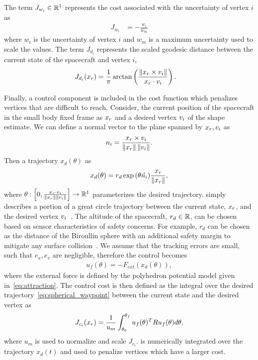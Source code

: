 \documentclass[journal]{new-aiaa}
\begin{document}
The term \( J_{w_i} \in \mathbb{R}^1 \) represents the cost associated with the uncertainty of vertex \( i \) as
\begin{align}\label{eq:weight_cost}
    J_{w_i} &= - \frac{w_i}{w_m}
\end{align}
where \( w_i \) is the uncertainty of vertex \( i \) and \( w_m \) is a maximum uncertainty used to scale the values.
The term \( J_{d_i} \) represents the scaled geodesic distance between the current state of the spacecraft and vertex \( i \),
\begin{align}\label{eq:distance_cost}
    J_{d_i}(x_r) &= \frac{1}{\pi} \arctan \left(  \frac{\left\| x_r \times v_i \right\|}{x_r \cdot v_i} \right).
\end{align}

Finally, a control component is included in the cost function which penalizes vertices that are difficult to reach.
Consider, the current position of the spacecraft in the small body fixed frame as \( x_r\) and a desired vertex \( v_i \) of the shape estimate.
We can define a normal vector to the plane spanned by \( x_r, v_i \) as
\begin{align}\label{eq:normal_to_plane}
    n_i = \frac{x_r \times v_i}{\left\| x_r \right\| \left\| v_i \right\|}.
\end{align}
Then a trajectory \( x_d(\theta) \) as
\begin{align}\label{eq:spherical_waypoint}
    x_d(\theta) = r_d \exp{\ensuremath{\left( \theta \hat{n_i} \right)} } \frac{x_r}{\left\| x_r \right\|},
\end{align}
where \( \theta : \left[ 0, \frac{x_r \cdot v_i}{\left\| x_r \right\|\left\| v_i \right\|} \right] \to \mathbb{R}^1\) parameterizes the desired trajectory.
 simply describes a portion of a great circle trajectory between the current state, \( x_r \), and the desired vertex \( v_i \)~\cite{chen2016}.
The altitude of the spacecraft, \( r_d \in \mathbb{R} \), can be chosen based on sensor characteristics of safety concerns.
For example, \( r_d \) can be chosen as the distance of the Biroullin sphere with an additional safety margin to mitigate any surface collision~\cite{scheeres2012a}.
We assume that the tracking errors are small, such that \( e_x, e_v \) are negligible, therefore the control becomes
\begin{align}\label{eq:tracking_control_cost}
    u_f(\theta) = -F_{ext}(x_d(\theta)), 
\end{align}
where the external force is defined by the polyhedron potential model given in~\cref{eq:attraction}.
The control cost is then defined as the integral over the desired trajectory~\cref{eq:spherical_waypoint} between the current state and the desired vertex as
\begin{align}\label{eq:control_cost}
    J_{c_i}(x_r) = \frac{1}{u_m} \int_{\theta_0}^{\theta_f} u_f(\theta)^T R u_f(\theta) d\theta,
\end{align}
where \( u_m \) is used to normalize and scale \( J_{c_i} \).
 is numerically integrated over the trajectory \( x_d(t) \) and used to penalize vertices which have a larger cost.
\end{document}
